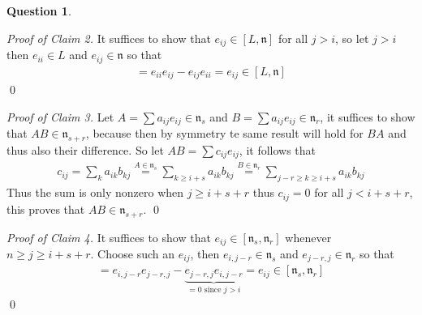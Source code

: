 \documentclass[10.5pt]{article}
\theoremstyle{definition}
\newtheorem{pb}{Question}
\numberwithin{example}{subsection}
\numberwithin{proposition}{subsection}
\begin{document}
\begin{pb}
\begin{enumerate}
            \emph{Proof of Claim 2.} It suffices to show that \(e_{ij} \in [L,\mathfrak{n}]\) for all \(j > i\), so let \(j > i\) then \(e_{ii} \in L\) and \(e_{ij} \in \mathfrak{n}\) so that
            \begin{align}
                [e_ii,e_{ij}] = e_{ii}e_{ij} - e_{ij}e_{ii} = e_{ij} \in [L,\mathfrak{n}]
            \end{align} \qed

            \emph{Proof of Claim 3.} Let \(A = \sum a_{ij}e_{ij} \in \mathfrak{n}_s\) and \(B = \sum a_{ij}e_{ij} \in \mathfrak{n}_r\), it suffices to show that \(AB \in \mathfrak{n}_{s+r}\), because then by symmetry te same result will hold for \(BA\) and thus also their difference. So let \(AB = \sum c_{ij}e_{ij}\), it follows that
            \begin{align}
                c_{ij} = \sum_{k} a_{ik}b_{kj} \overset{A \in \mathfrak{n}_s}{=} \sum_{k \geq i +s} a_{ik}b_{kj} \overset{B \in \mathfrak{n}_r}{=} \sum_{j - r \geq k \geq i + s} a_{ik}b_{kj}
            \end{align}
            Thus the sum is only nonzero when \(j \geq i+ s + r\) thus \(c_{ij} = 0\) for all \(j < i + s + r\), this proves that \(AB \in \mathfrak{n}_{s+r}\). \qed

            \emph{Proof of Claim 4.} It suffices to show that \(e_{ij} \in [\mathfrak{n}_s,\mathfrak{n}_r]\) whenever \(n \geq j \geq i + s + r\). Choose such an \(e_{ij}\), then \(e_{i,j-r} \in \mathfrak{n}_s\) and \(e_{j-r,j} \in \mathfrak{n}_r\) so that
            \begin{align}
                [e_{i,j-r},e_{j-r,j}] = e_{i,j-r}e_{j-r,j} - \underbrace{e_{j-r,j}e_{i,j-r}}_{=0 \text{ since }j > i} = e_{ij} \in [\mathfrak{n}_s,\mathfrak{n}_r]
            \end{align}
            \qed
        \end{enumerate}
    \end{pb}
\end{document}
